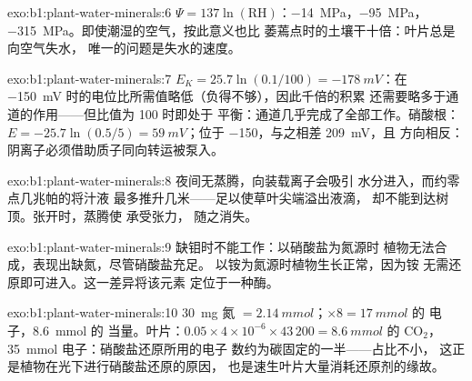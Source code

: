\begin{solution}{exo:b1:plant-water-minerals:6}
$\Psi = 137\ln(\text{RH})$：\qty{-14}{MPa}，\qty{-95}{MPa}，
\qty{-315}{MPa}。即使潮湿的空气，按此意义也比
萎蔫点时的土壤干十倍：叶片总是向空气失水，
唯一的问题是失水的速度。
\end{solution}

\begin{solution}{exo:b1:plant-water-minerals:7}
$E_K = 25.7\ln(0.1/100) = \qty{-178}{mV}$：在 \qty{-150}{mV}
时的电位比所需值略低（负得不够），因此千倍的积累
还需要略多于通道的作用——但比值为 100 时即处于
平衡：通道几乎完成了全部工作。硝酸根：$E = -25.7\ln(0.5/5)
= \qty{+59}{mV}$；位于 \qty{-150}{}，与之相差 \qty{209}{mV}，且
方向相反：阴离子必须借助质子同向转运被泵入。
\end{solution}

\begin{solution}{exo:b1:plant-water-minerals:8}
夜间无蒸腾，向装载离子会吸引
水分进入，而约零点几兆帕的将汁液
最多推升几米——足以使草叶尖端溢出液滴，
却不能到达树顶。张开时，蒸腾使
承受张力，
随之消失。
\end{solution}

\begin{solution}{exo:b1:plant-water-minerals:9}
缺钼时不能工作：以硝酸盐为氮源时
植物无法合成，表现出缺氮，尽管硝酸盐充足。
以铵为氮源时植物生长正常，因为铵
无需还原即可进入。这一差异将该元素
定位于一种酶。
\end{solution}

\begin{solution}{exo:b1:plant-water-minerals:10}
\qty{30}{mg} 氮 $= \qty{2.14}{mmol}$；$\times 8 = \qty{17}{mmol}$ 的
电子，\qty{8.6}{mmol} 的  当量。叶片：$0.05\times
4\times 10^{-6}\times 43\,200 = \qty{8.6}{mmol}$ 的 $\mathrm{CO_2}$，
\qty{35}{mmol} 电子：硝酸盐还原所用的电子
数约为碳固定的一半——占比不小，
这正是植物在光下进行硝酸盐还原的原因，
也是速生叶片大量消耗还原剂的缘故。
\end{solution}

